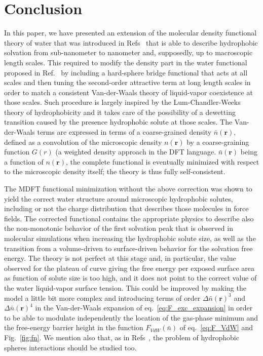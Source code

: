 \documentclass[aip,jcp,preprint]{revtex4-1}
\newcommand{\rhon}{{n\left({\mathbf r}\right)}}
\newcommand{\rhonbar}{\bar{n}({\mathbf r})}
\begin{document}
\section{Conclusion}

In this paper, we have presented an extension of the molecular density functional theory of water that was introduced in Refs~\cite{zhao11,jeanmairet13} that is able to describe hydrophobic solvation from sub-nanometer to nanometer and, supposedly, up to macroscopic length scales.  This required to modify the density part in the water functional proposed in Ref.~\cite{jeanmairet13} by including a hard-sphere bridge functional that acts at all scales and then tuning the second-order attractive term at long length scales in order to match a  consistent Van-der-Waals theory of liquid-vapor coexistence at those scales. Such procedure is largely inspired  by the Lum-Chandler-Weeks theory of hydrophobicity and it takes care of the possibility of a dewetting transition caused by the presence hydrophobic solute at those scales.  The Van-der-Waals terms are expressed in terms of a  coarse-grained density $\rhonbar$, defined as a convolution of the microscopic density $\rhon$ by a coarse-graining function $G(r)$ (a  weighted density  approach in the DFT language\cite{sun01}. $\rhonbar$ being a function of $\rhon$, the complete functional is eventually minimized with respect to the microscopic density itself; the theory is thus fully self-consistent.

The MDFT functional minimization without the above correction was shown to yield the correct water structure around microscopic hydrophobic solutes, including or not the charge distribution that describes those molecules in force fields. The corrected functional contains the appropriate physics to describe also the non-monotonic behavior of the first solvation peak that is observed in molecular simulations when increasing the hydrophobic solute size, as well as the transition from a volume-driven to surface-driven behavior for the solvation free energy. The theory is not perfect at this stage and, in particular,  the value observed for the plateau of curve giving the free energy per exposed surface area  as function of solute size is too high, and  it does not point to the correct value of the water liquid-vapor surface tension. This could be improved by making the model  a little bit more complex and introducing terms of order $\Delta \rhonbar^3$ and  $\Delta \rhonbar^4$ in the Van-der-Waals expansion of eq.~\ref{eq:F_exc_expansion} in order to be able to modulate independently the location of the gas-phase minimum and the free-energy barrier height in the function $F_{VdW}(\bar{n})$ of eq.~\ref{eq:F_VdW} and Fig.~\ref{fig:fn}. We mention also that, as in Refs~\cite{dzubiella04,roundy13}, the problem of hydrophobic spheres interactions should be studied too.
\end{document}
